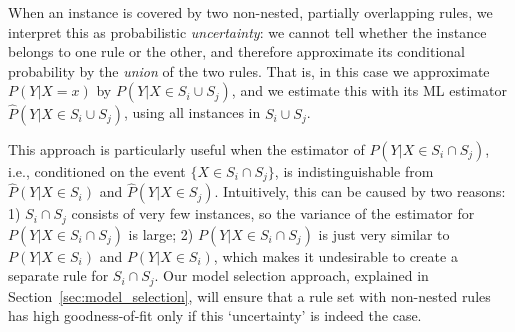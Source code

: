 
When an instance is covered by two non-nested, partially overlapping rules, we interpret this as probabilistic \emph{uncertainty}: we cannot tell whether the instance belongs to one rule or the other, and therefore approximate its conditional probability by the \emph{union} of the two rules. That is, in this case we approximate $P(Y|X=x)$ by $P(Y|X \in S_i \cup S_j)$, and we estimate this with its ML estimator $\hat{P}(Y|X \in S_i \cup S_j)$, using all instances in $S_i \cup S_j$. 

This approach is particularly useful when the estimator of $P(Y|X \in S_i \cap S_j)$, i.e., conditioned on the event $\{X \in S_i \cap S_j\}$, is indistinguishable from $\hat{P}(Y|X \in S_i)$ and $\hat{P}(Y|X \in S_j)$. Intuitively, this can be caused by two reasons: 1) $S_i \cap S_j$ consists of very few instances, so the variance of the estimator for $P(Y|X \in S_i \cap S_j)$ is large; 2) $P(Y|X \in S_i \cap S_j)$ is just very similar to $P(Y|X \in S_i)$ and $P(Y|X \in S_i)$, which makes it undesirable to create a separate rule for $S_i \cap S_j$. Our model selection approach, explained in Section~\ref{sec:model_selection}, will ensure that a rule set with non-nested rules has high goodness-of-fit only if this `uncertainty' is indeed the case. 


